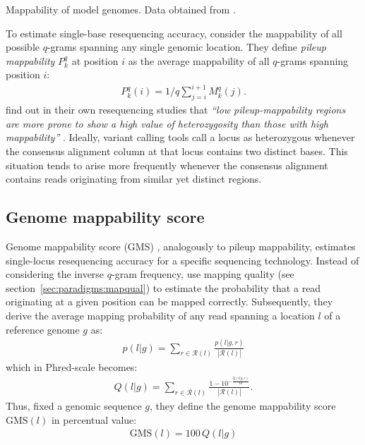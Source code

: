 \begin{table}[h]
\begin{center}
\caption[Mappability of model genomes]{Mappability of model genomes. Data obtained from \citep{Derrien2012}.}
\sffamily

\label{tab:mappability}
\end{center}
\end{table}

To estimate single-base resequencing accuracy, \citeauthor{Derrien2012} consider the mappability of all possible $q$-grams spanning any single genomic location.
They define \emph{pileup mappability} $P^q_k$ at position $i$ as the average mappability of all $q$-grams spanning position $i$:
\begin{eqnarray}
P^q_k(i) = 1/q \sum_{j=i}^{i+1}{M^q_k(j)}.
\end{eqnarray}
\citeauthor{Derrien2012} find out in their own resequencing studies that \emph{``low pileup-mappability regions are more prone to show a high value of heterozygosity than those with high mappability''} \citep{Derrien2012}.
Ideally, variant calling tools call a locus as heterozygous whenever the consensus alignment column at that locus contains two distinct bases.
This situation tends to arise more frequently whenever the consensus alignment contains reads originating from similar yet distinct regions.

\subsection{Genome mappability score}

Genome mappability score (GMS) \citep{Lee2012}, analogously to pileup mappability, estimates single-locus resequencing accuracy for a specific sequencing technology.
Instead of considering the inverse $q$-gram frequency, \citeauthor{Lee2012} use mapping quality (see section~\ref{sec:paradigms:mapqual}) to estimate the probability that a read originating at a given position can be mapped correctly.
Subsequently, they derive the average mapping probability of any read spanning a location $l$ of a reference genome $g$ as:
\begin{eqnarray}
\label{eq:gms}
p(l|g) = \sum_{r \in \mathcal{R}(l)}{\frac{p(l|g,r)}{|\mathcal{R}(l)|}}
\end{eqnarray}
which in Phred-scale becomes:
\begin{eqnarray}
Q(l|g) = \sum_{r \in \mathcal{R}(l)}{\frac{1 - 10^{-\frac{Q(l|g,r)}{10}}}{|\mathcal{R}(l)|}}.
\end{eqnarray}
Thus, fixed a genomic sequence $g$, they define the genome mappability score $\text{GMS}(l)$ in percentual value:
\begin{eqnarray}
\text{GMS}(l) = 100 \, Q(l|g)
\end{eqnarray}


